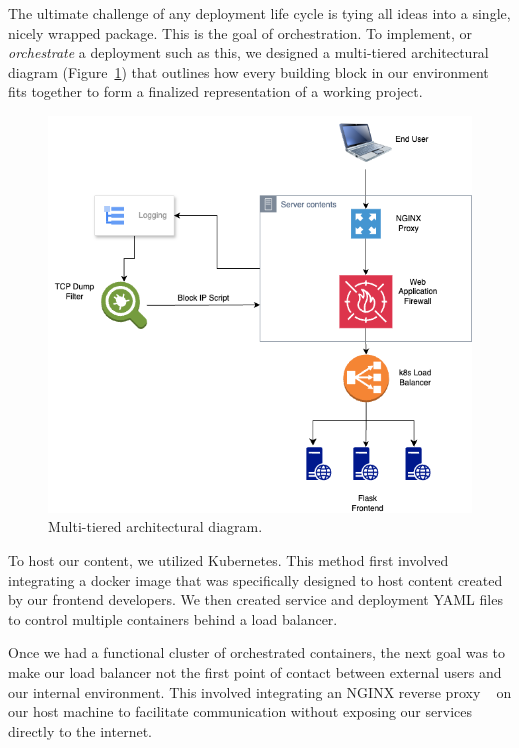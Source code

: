 The ultimate challenge of any deployment life cycle is tying all ideas into a single, nicely wrapped package. This is the goal of orchestration.
To implement, or \textit{orchestrate} a deployment such as this, we designed a multi-tiered architectural diagram (Figure~\ref{fig:architecture})
that outlines how every building block in our environment fits together to form a finalized representation of a working project. 

\begin{figure}[h]
    \centering
    \includegraphics[width=\columnwidth]{resources/diagram.png} 
    \caption{Multi-tiered architectural diagram.}
    \label{fig:architecture}
\end{figure}

To host our content, we utilized Kubernetes. This method first involved integrating a docker image that was specifically designed to host content created by our frontend developers.
We then created service and deployment YAML files to control multiple containers behind a load balancer. 

Once we had a functional cluster of orchestrated containers, the next goal was to make our load balancer not the first point of contact between external users and our internal environment. 
This involved integrating an NGINX reverse proxy ~\cite{nginx} on our host machine to facilitate communication without exposing our services directly to the internet. 

